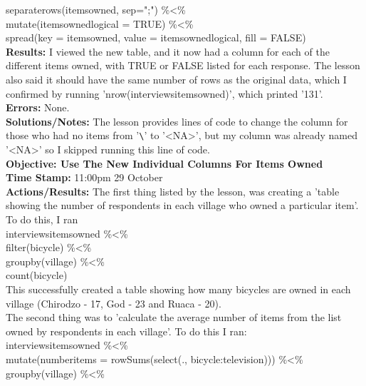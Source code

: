 \documentclass{article}
\begin{document}
\begin{FlushLeft}
    separate\textunderscore rows(items\textunderscore owned, sep=";") \%\textless\%\\
    mutate(items\textunderscore owned\textunderscore logical = TRUE) \%\textless\%\\
    spread(key = items\textunderscore owned, value = items\textunderscore owned\textunderscore logical, fill = FALSE)\\
\textbf{Results:} I viewed the new table, and it now had a column for each of the different items owned, with TRUE or FALSE listed for each response. The lesson also said it should have the same number of rows as the original data, which I confirmed by running 'nrow(interviews\textunderscore items\textunderscore owned)', which printed '131'.\\
\textbf{Errors:} None.\\
\textbf{Solutions/Notes:} The lesson provides lines of code to change the column for those who had no items from '\verb|\|' to '\textless NA\textgreater ', but my column was already named '\textless NA\textgreater ' so I skipped running this line of code.\\
\vspace{5mm}
\textbf{Objective: Use The New Individual Columns For Items Owned}\\ 
\textbf{Time Stamp:} 11:00pm 29 October\\
\textbf{Actions/Results:} The first thing listed by the lesson, was creating a 'table showing the number of respondents in each village who owned a particular item'. To do this, I ran\\
interviews\textunderscore items\textunderscore owned \%\textless\%\\
filter(bicycle) \%\textless\%\\
group\textunderscore by(village) \%\textless\%\\
count(bicycle)\\
This successfully created a table showing how many bicycles are owned in each village (Chirodzo - 17, God - 23 and Ruaca - 20).\\
The second thing was to 'calculate the average number of items from the list owned by respondents in each village'. To do this I ran:\\
interviews\textunderscore items\textunderscore owned \%\textless\%\\
mutate(number\textunderscore items = rowSums(select(., bicycle:television))) \%\textless\%\\
group\textunderscore by(village) \%\textless\%\\

\end{FlushLeft}
\end{document}
